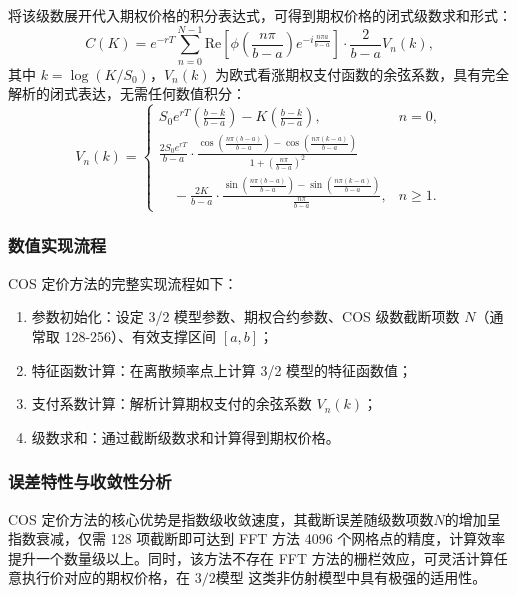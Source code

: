 将该级数展开代入期权价格的积分表达式，可得到期权价格的闭式级数求和形式：
\begin {equation}
  C (K) = e^{-rT} \sum_{n=0}^{N-1} \text {Re}\left [ \phi\left ( \frac {n\pi}{b-a} \right) e^{-i \frac {n\pi a}{b-a}} \right] \cdot \frac {2}{b-a} V_n (k),
\end {equation}
其中 $k = \log(K/S_0)$，$V_n(k)$ 为欧式看涨期权支付函数的余弦系数，具有完全解析的闭式表达，无需任何数值积分：
\begin{equation}
V_n(k) =
\begin{cases}
S_0 e^{rT} \left( \frac{b - k}{b - a} \right) - K \left( \frac{b - k}{b - a} \right), & n = 0, \\[10pt]
\frac{2 S_0 e^{rT}}{b - a} \cdot \frac{\cos\left( \frac{n\pi (b - a)}{b - a} \right) - \cos\left( \frac{n\pi (k - a)}{b - a} \right)}{1 + \left( \frac{n\pi}{b - a} \right)^2} \\
\quad - \frac{2 K}{b - a} \cdot \frac{\sin\left( \frac{n\pi (b - a)}{b - a} \right) - \sin\left( \frac{n\pi (k - a)}{b - a} \right)}{\frac{n\pi}{b - a}}, & n \geq 1.
\end{cases}
\end{equation}
\subsubsection{数值实现流程}
COS 定价方法的完整实现流程如下：
\begin{enumerate}
    \item 参数初始化：设定 3/2 模型参数、期权合约参数、COS 级数截断项数 $N$（通常取 128-256）、有效支撑区间 $[a,b]$；
    
    \item 特征函数计算：在离散频率点上计算 3/2 模型的特征函数值；
    
    \item 支付系数计算：解析计算期权支付的余弦系数 $V_n(k)$；
    
    \item 级数求和：通过截断级数求和计算得到期权价格。
\end{enumerate}

\subsubsection{误差特性与收敛性分析}
COS 定价方法的核心优势是指数级收敛速度，其截断误差随级数项数$N$的增加呈指数衰减，仅需 128 项截断即可达到 FFT 方法 4096 个网格点的精度，计算效率提升一个数量级以上。同时，该方法不存在 FFT 方法的栅栏效应，可灵活计算任意执行价对应的期权价格，在 $3/2$模型 这类非仿射模型中具有极强的适用性。

